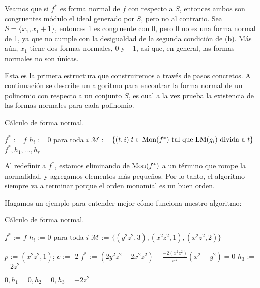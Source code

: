 Veamos que si $f^*$ es forma normal de $f$ con respecto a $S$, entonces ambos son congruentes módulo el ideal generado por $S$, pero no al contrario. Sea $S = \{x_1, x_1+1\}$, entonces 1 es congruente con 0, pero 0 no es una forma normal de 1, ya que no cumple con la desigualdad de la segunda condición de (b). Más aún, $x_1$ tiene dos formas normales, $0$ y $-1$, así que, en general, las formas normales no son únicas.

Esta es la primera estructura que construiremos a través de pasos concretos. A continuación se describe un algoritmo para encontrar la forma normal de un polinomio con respecto a un conjunto $S$, es cual a la vez prueba la existencia de las formas normales para cada polinomio.

\begin{algo}Cálculo de forma normal.

\begin{algorithm}[H]
 $f^*$ := $f$\;
 $h_i$ := $0$ para toda $i$\;
 $\mathcal{M}$ := $\{(t, i)| t \in \textrm{Mon}(f^*) \textrm{ tal que } \textrm{LM}(g_i)\textrm{ divida a }t \}$\;
 \Return $f^*, h_1, \dots, h_r$\;
\end{algorithm}
\end{algo}

Al redefinir a $f^*$, estamos eliminando de $\textrm{Mon}(f^*)$ a un término que rompe la normalidad, y agregamos elementos más pequeños. Por lo tanto, el algoritmo siempre va a terminar porque el orden monomial es un buen orden.

Hagamos un ejemplo para entender mejor cómo funciona nuestro algoritmo:

\begin{example}Cálculo de forma normal.

\begin{algorithm}[H]
 $f^*$ := $f$\;
 $h_i$ := $0$ para toda $i$\;
 $\mathcal{M}$ := $\{(y^2z^2, 3), (x^2z^2, 1), (x^2z^2, 2)\}$\;
 
 
  $p$ := $(x^2z^2, 1)$;
  $c$ := -2\;
  $f^*$ := $(2y^2z^2 - 2x^2z^2) - \frac{-2(x^2z^2)}{x^2}(x^2 - y^2) = 0$\;
  $h_3$ := $-2z^2$\;
 
 
 \Return $0, h_1 = 0, h_2 = 0, h_3 = -2z^2$\;
\end{algorithm}
\end{example}

